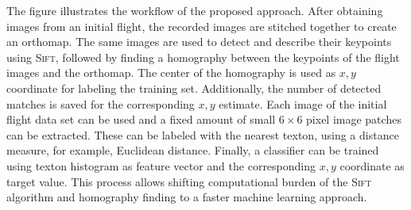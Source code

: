 \label{fig:overview}
The figure illustrates
    the workflow of the proposed approach. After obtaining images from an initial flight,
    the recorded images are stitched together to create an orthomap. The same
    images are used to detect and describe their keypoints using
    \textsc{Sift}, followed by finding a homography between the keypoints of the flight
    images and the orthomap. The center of the homography is used as
    $x, y$ coordinate for labeling the training set. Additionally, the
    number of detected matches is saved for the corresponding $x, y$
    estimate. Each image of the initial flight data set can be used
    and a fixed amount of small $6\times6$ pixel image patches can be
    extracted. These can be labeled with the nearest texton, using a
    distance measure, for example, Euclidean distance. Finally, a
    classifier can be trained using texton histogram as feature vector
    and the corresponding $x, y$ coordinate as target value. This
    process allows shifting computational burden of the \textsc{Sift}
    algorithm and homography finding to a faster machine learning
    approach.